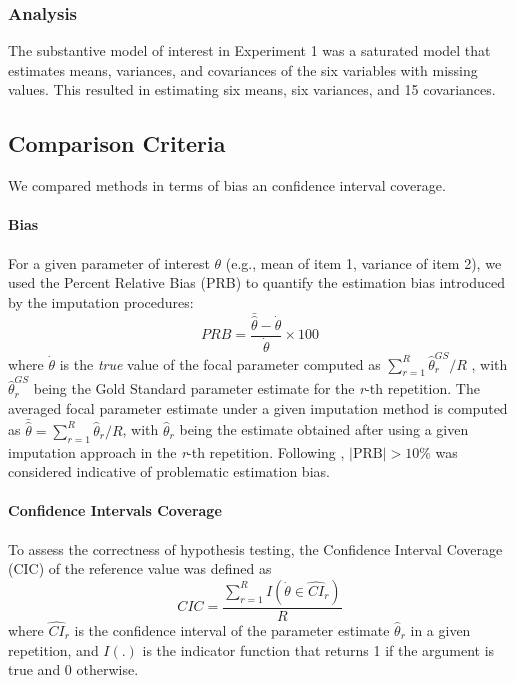 \subsubsection{Analysis}
	The substantive model of interest in Experiment 1 was a saturated model that estimates means,
	variances, and covariances of the six variables with missing values.
	This resulted in estimating six means, six variances, and 15 covariances.

\subsection{Comparison Criteria} \label{criteria}

	We compared methods in terms of bias an confidence interval coverage.

	\paragraph{Bias}

	For a given parameter of interest $\theta$ (e.g., mean of item 1, variance of item 2), we used the Percent Relative Bias 
	(PRB) to quantify the estimation bias introduced by the imputation procedures:
%
	\begin{equation} \label{eqn:prb}
		PRB = \frac{\bar{\hat{\theta}} - \dot{\theta}}{\dot{\theta}} \times 100
	\end{equation}
%
	where $\dot{\theta}$ is the \emph{true} value of the focal parameter computed as 
	$\sum_{r=1}^{R} \hat{\theta}_{r}^{GS}/R$
	, with
	$\hat{\theta}_{r}^{GS}$ 
	being the Gold Standard parameter estimate for the \emph{r}-th repetition. 
	The averaged focal parameter estimate under a given imputation method is computed as 
	$\bar{\hat{\theta}} = \sum_{r=1}^{R} \hat{\theta}_{r}/R$,
	with
	$\hat{\theta}_{r}$ being the estimate obtained after using a given imputation approach in the 
	\emph{r}-th repetition.
	Following \cite{muthenEtAl:1987}, $|\text{PRB}| > 10\%$ was considered indicative of problematic 
	estimation bias.

	\paragraph{Confidence Intervals Coverage}
	To assess the correctness of hypothesis testing, the Confidence Interval Coverage (CIC) of the reference value
	was defined as
%
	\begin{equation} \label{eqn:cic}
		CIC =  \frac{ \sum_{r=1}^{R} I(\dot{\theta} \in \widehat{CI}_r ) }{R}
	\end{equation}
%
	where $\widehat{CI}_r$ is the confidence interval of the parameter estimate $\hat{\theta}_{r}$ in a given repetition, 
	and $I(.)$ is the indicator function that returns 1 if the argument is true and 0 otherwise.
	
